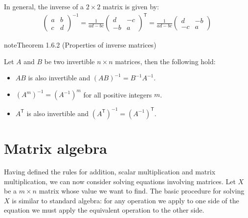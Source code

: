 \documentclass[letterpaper,10pt,english]{jupyterBook}
\begin{document}
\sphinxAtStartPar
In general, the inverse of a \(2 \times 2\) matrix is given by:
\begin{align*}
    \begin{pmatrix} a & b \\ c & d \end{pmatrix}^{-1} = \frac{1}{ad - bc}\begin{pmatrix} d & -c \\ -b & a \end{pmatrix}^\mathsf{T}
= \frac{1}{ad - bc}\begin{pmatrix} d & -b \\ -c & a \end{pmatrix}
\end{align*} 
\ignorespaces \label{_pages/1.5_Inverse_matrix:inverse-matrix-properties-theorem}
\begin{sphinxadmonition}{note}{Theorem 1.6.2 (Properties of inverse matrices)}



\sphinxAtStartPar
Let \(A\) and \(B\) be two invertible \(n \times n\) matrices, then the following hold:
\begin{itemize}
\item {} 
\sphinxAtStartPar
\(AB\) is also invertible and \((AB)^{-1} = B^{-1}A^{-1}.\)

\item {} 
\sphinxAtStartPar
\((A^m)^{-1} = (A^{-1})^m\) for all positive integers \(m\).

\item {} 
\sphinxAtStartPar
\(A^\mathsf{T}\) is also invertible and \((A^\mathsf{T})^{-1} = (A^{-1})^\mathsf{T}\).

\end{itemize}
\end{sphinxadmonition}

\sphinxstepscope


\section{Matrix algebra}
\label{\detokenize{_pages/1.6_Matrix_algebra:matrix-algebra}}\label{\detokenize{_pages/1.6_Matrix_algebra:matrix-algebra-section}}\label{\detokenize{_pages/1.6_Matrix_algebra::doc}}
\ignorespaces 
\sphinxAtStartPar
Having defined the rules for addition, scalar multiplication and matrix multiplication, we can now consider solving equations involving matrices. Let \(X\) be a \(m \times n\) matrix whose value we want to find. The basic procedure for solving \(X\) is similar to standard algebra: for any operation we apply to one side of the equation we must apply the equivalent operation to the other side.
\end{document}
